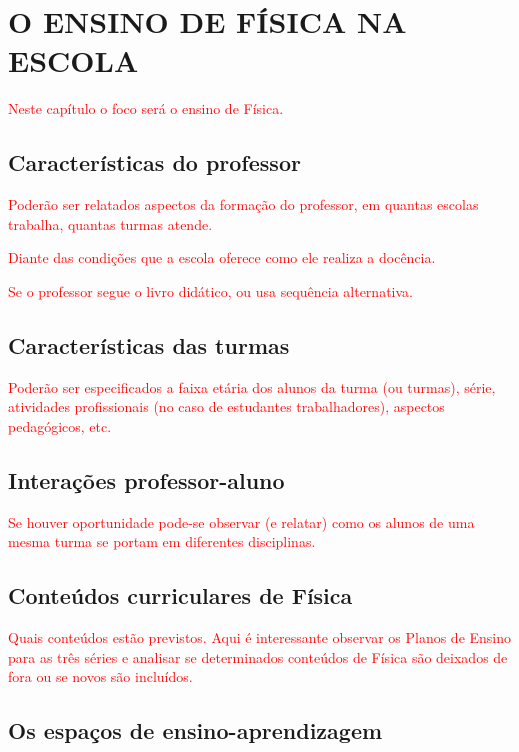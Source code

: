 \documentclass[12pt,a4paper]{article}
\begin{document}
\newpage

\section{O ENSINO DE FÍSICA NA ESCOLA}

        \textcolor{red}{Neste capítulo o foco será o ensino de Física.}

    \subsection{Características do professor}

        \textcolor{red}{Poderão ser relatados aspectos da formação do professor, em quantas escolas trabalha, quantas turmas atende.}

        \textcolor{red}{Diante das condições que a escola oferece como ele realiza a docência.}

        \textcolor{red}{Se o professor segue o livro didático, ou usa sequência alternativa.}

    \subsection{Características das turmas}

        \textcolor{red}{Poderão ser especificados a faixa etária dos alunos da turma (ou turmas), série, atividades profissionais (no caso de estudantes trabalhadores), aspectos pedagógicos, etc.}

    \subsection{Interações professor-aluno}

        \textcolor{red}{Se houver oportunidade pode-se observar (e relatar) como os alunos de uma mesma turma se portam em diferentes disciplinas.}

    \subsection{Conteúdos curriculares de Física}

        \textcolor{red}{Quais conteúdos estão previstos. Aqui é interessante observar os Planos de Ensino para as três séries e analisar se determinados conteúdos de Física são deixados de fora ou se novos são incluídos.}

    \subsection{Os espaços de ensino-aprendizagem}
\end{document}
